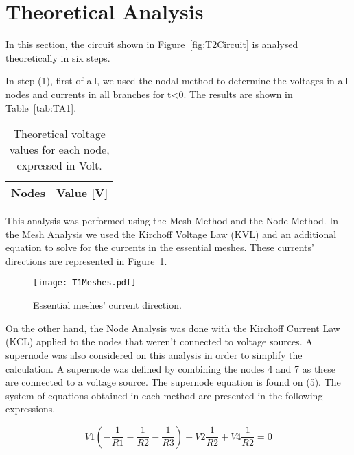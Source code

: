 \section{Theoretical Analysis}
\label{sec:analysis}

In this section, the circuit shown in Figure~\ref{fig:T2Circuit} is analysed theoretically in six steps.

In step (1), first of all, we used the nodal method to determine the voltages in all nodes and currents in all branches for t<0. The results are shown in Table~\ref{tab:TA1}.

\begin{table}[h]
  \centering
  \begin{tabular}{|l|r|}
    \hline    
    {\bf Nodes} & {\bf Value [V]} \\ \hline
    
  \end{tabular}
  \caption{Theoretical voltage values for each node, expressed in Volt.}
  \label{tab:nos}
\end{table}

\vspace{1.0cm}

This analysis was performed using the Mesh Method and the Node Method. 
In the Mesh Analysis we used the Kirchoff Voltage Law (KVL) and an additional equation to solve for the currents in the essential meshes. These currents' directions are represented in Figure~\ref{fig:T1Meshes}.

\vspace{6.0cm}

\begin{figure}[h] \centering
\texttt{[image: T1Meshes.pdf]}
\caption{Essential meshes' current direction.}
\label{fig:T1Meshes}
\end{figure}

On the other hand, the Node Analysis was done with the Kirchoff Current Law (KCL) applied to the nodes that weren't connected to voltage sources. A supernode was also considered on this analysis in order to simplify the calculation. A supernode was defined by combining the nodes 4 and 7 as these are connected to a voltage source. The supernode equation is found on (5).
The system of equations obtained in each method are presented in the following expressions.

\begin{equation}
  V1(-\frac{1}{R1}-\frac{1}{R2}-\frac{1}{R3}) + V2\frac{1}{R2} + V4\frac{1}{R2} = 0
\end{equation}


